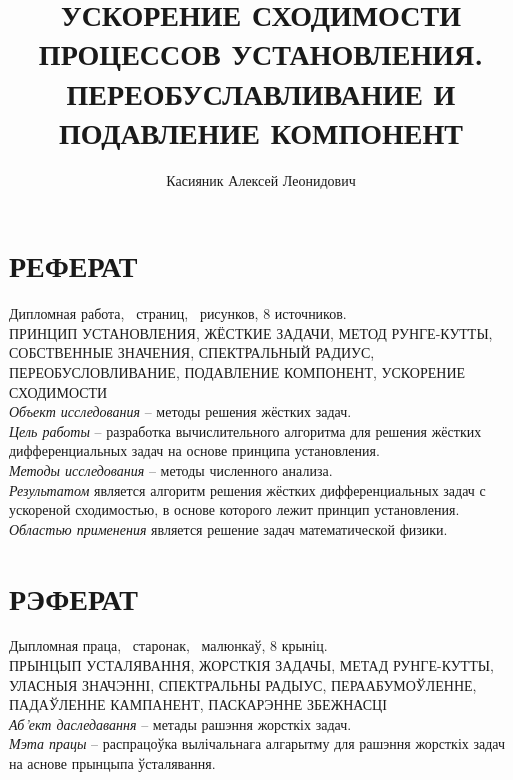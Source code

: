 \documentclass[a4paper,14pt]{extreport}
\title{УСКОРЕНИЕ СХОДИМОСТИ ПРОЦЕССОВ УСТАНОВЛЕНИЯ. ПЕРЕОБУСЛАВЛИВАНИЕ И ПОДАВЛЕНИЕ КОМПОНЕНТ}
\author{Касияник Алексей Леонидович}
\begin{document}
  \maketitle
  
  \setcounter{page}{2}
\newpage
\chapter*{РЕФЕРАТ}

Дипломная работа, \pageref{LastPage}~страниц, \totfig~рисунков, 8 источников.
~\\

ПРИНЦИП УСТАНОВЛЕНИЯ, ЖЁСТКИЕ ЗАДАЧИ, МЕТОД РУНГЕ-КУТТЫ, СОБСТВЕННЫЕ ЗНАЧЕНИЯ, СПЕКТРАЛЬНЫЙ РАДИУС, ПЕРЕОБУСЛОВЛИВАНИЕ, ПОДАВЛЕНИЕ КОМПОНЕНТ, УСКОРЕНИЕ СХОДИМОСТИ
~\\

\textit{Объект исследования} – методы решения жёстких задач.
~\\

\textit{Цель работы} – разработка вычислительного алгоритма для решения жёстких дифференциальных задач на основе принципа установления.
~\\

\textit{Методы исследования} – методы численного анализа.
~\\

\textit{Результатом} является алгоритм решения жёстких дифференциальных задач с ускореной сходимостью, в основе которого лежит принцип установления.
~\\

\textit{Областью применения} является решение задач математической физики.

\chapter*{РЭФЕРАТ}

Дыпломная праца, \pageref{LastPage}~старонак, \totfig~малюнкаў, 8 крыніц.
~\\

ПРЫНЦЫП УСТАЛЯВАННЯ, ЖОРСТКІЯ ЗАДАЧЫ, МЕТАД РУНГЕ-КУТТЫ, УЛАСНЫЯ ЗНАЧЭННІ, СПЕКТРАЛЬНЫ РАДЫУС, ПЕРААБУМОЎЛЕННЕ, ПАДАЎЛЕННЕ КАМПАНЕНТ, ПАСКАРЭННЕ ЗБЕЖНАСЦІ
~\\

\textit{Аб'ект даследавання} – метады рашэння жорсткіх задач.
~\\

\textit{Мэта працы} – распрацоўка вылічальнага алгарытму для рашэння жорсткіх задач на аснове прынцыпа ўсталявання.
~\\
\end{document}
